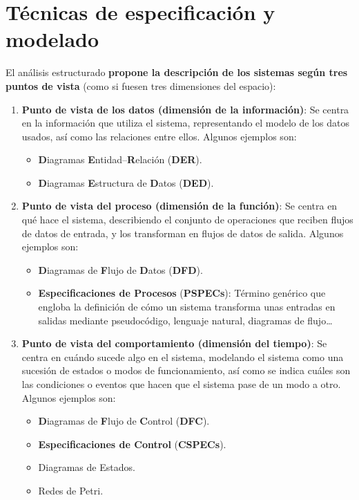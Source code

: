 \section{Técnicas de especificación y modelado}

El análisis estructurado \textbf{propone la descripción de los sistemas según tres puntos de vista} (como si fuesen tres dimensiones del espacio):

\begin{enumerate}
    \item \textbf{Punto de vista de los datos (dimensión de la información)}: Se centra en la información que utiliza el sistema, representando el modelo de los datos usados, así como las relaciones entre ellos. Algunos ejemplos son:
          \begin{itemize}
              \item \textbf{D}iagramas \textbf{E}ntidad--\textbf{R}elación (\textbf{DER}).
              \item \textbf{D}iagramas \textbf{E}structura de \textbf{D}atos (\textbf{DED}).
          \end{itemize}
    \item \textbf{Punto de vista del proceso (dimensión de la función)}: Se centra en qué hace el sistema, describiendo el conjunto de operaciones que reciben flujos de datos de entrada, y los transforman en flujos de datos de salida. Algunos ejemplos son:
          \begin{itemize}
              \item \textbf{D}iagramas de \textbf{F}lujo de \textbf{D}atos (\textbf{DFD}).
              \item \textbf{Especificaciones de Procesos} (\textbf{PSPECs}): Término genérico que engloba la definición de cómo un sistema transforma unas entradas en salidas mediante pseudocódigo, lenguaje natural, diagramas de flujo\ldots
          \end{itemize}
    \item \textbf{Punto de vista del comportamiento (dimensión del tiempo)}: Se centra en cuándo sucede algo en el sistema, modelando el sistema como una sucesión de estados o modos de funcionamiento, así como se indica cuáles son las condiciones o eventos que hacen que el sistema pase de un modo a otro. Algunos ejemplos son:
          \begin{itemize}
              \item \textbf{D}iagramas de \textbf{F}lujo de \textbf{C}ontrol (\textbf{DFC}).
              \item \textbf{Especificaciones de Control} (\textbf{CSPECs}).
              \item Diagramas de Estados.
              \item Redes de Petri.
          \end{itemize}
\end{enumerate}


